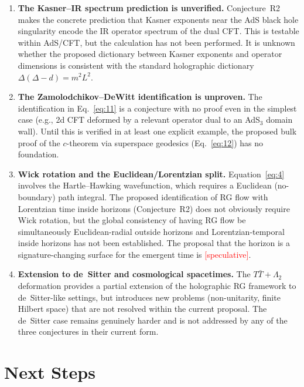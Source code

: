 \documentclass[11pt,a4paper]{article}
\begin{document}
\begin{enumerate}
  \item \textbf{The Kasner--IR spectrum prediction is unverified.} \label{ten:kasner}
  Conjecture~R2 makes the concrete prediction that Kasner exponents near the AdS black hole singularity encode the IR operator spectrum of the dual CFT. This is testable within AdS/CFT, but the calculation has not been performed. It is unknown whether the proposed dictionary between Kasner exponents and operator dimensions is consistent with the standard holographic dictionary $\Delta(\Delta - d) = m^2 L^2$.

  \item \textbf{The Zamolodchikov--DeWitt identification is unproven.} \label{ten:ZdW}
  The identification in Eq.~\eqref{eq:11} is a conjecture with no proof even in the simplest case (e.g., 2d CFT deformed by a relevant operator dual to an AdS$_3$ domain wall). Until this is verified in at least one explicit example, the proposed bulk proof of the $c$-theorem via superspace geodesics (Eq.~\eqref{eq:12}) has no foundation.

  \item \textbf{Wick rotation and the Euclidean/Lorentzian split.} \label{ten:wick}
  Equation~\eqref{eq:4} involves the Hartle--Hawking wavefunction, which requires a Euclidean (no-boundary) path integral. The proposed identification of RG flow with Lorentzian time inside horizons (Conjecture~R2) does not obviously require Wick rotation, but the global consistency of having RG flow be simultaneously Euclidean-radial outside horizons and Lorentzian-temporal inside horizons has not been established. The proposal that the horizon is a signature-changing surface for the emergent time is \textcolor{red}{[speculative]}.

  \item \textbf{Extension to de~Sitter and cosmological spacetimes.} \label{ten:dS}
  The $T\bar{T} + \Lambda_2$ deformation provides a partial extension of the holographic RG framework to de~Sitter-like settings, but introduces new problems (non-unitarity, finite Hilbert space) that are not resolved within the current proposal. The de~Sitter case remains genuinely harder and is not addressed by any of the three conjectures in their current form.

\end{enumerate}

\section{Next Steps}
\label{sec:nextsteps}
\end{document}
